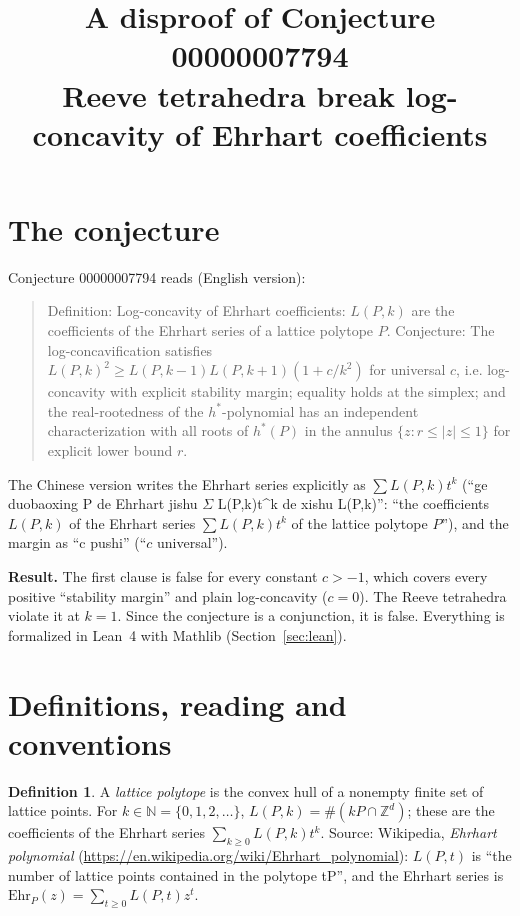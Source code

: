 \documentclass[11pt]{article}
\title{A disproof of Conjecture 00000007794\\[2pt]
\large Reeve tetrahedra break log-concavity of Ehrhart coefficients}
\date{}
\renewcommand{\_}{\oldus\allowbreak}
\theoremstyle{definition}
\newtheorem{definition}[theorem]{Definition}
\newcommand{\Z}{\mathbb{Z}}
\newcommand{\N}{\mathbb{N}}
\begin{document}
\sloppy
\maketitle

\section{The conjecture}

Conjecture 00000007794 reads (English version):

\begin{quote}
Definition: Log-concavity of Ehrhart coefficients: $L(P,k)$ are the coefficients of the Ehrhart series of
a lattice polytope $P$. Conjecture: The log-concavification satisfies $L(P,k)^2 \ge L(P,k-1)
L(P,k+1)(1 + c/k^2)$ for universal $c$, i.e. log-concavity with explicit stability margin; equality
holds at the simplex; and the real-rootedness of the $h^*$-polynomial has an independent
characterization with all roots of $h^*(P)$ in the annulus $\{z: r \le |z| \le 1\}$ for explicit lower
bound $r$.
\end{quote}

The Chinese version writes the Ehrhart series explicitly as $\sum L(P,k)t^k$ (``ge duobaoxing P de
Ehrhart jishu $\Sigma$ L(P,k)t\^{}k de xishu L(P,k)'': ``the coefficients $L(P,k)$ of the Ehrhart series
$\sum L(P,k)t^k$ of the lattice polytope $P$''), and the margin as ``c pushi'' (``$c$ universal'').

\textbf{Result.} The first clause is false for every constant $c > -1$, which covers every positive
``stability margin'' and plain log-concavity ($c = 0$). The Reeve tetrahedra violate it at $k = 1$.
Since the conjecture is a conjunction, it is false. Everything is formalized in Lean~4 with Mathlib
(Section~\ref{sec:lean}).

\section{Definitions, reading and conventions}

\begin{definition}
A \emph{lattice polytope} is the convex hull of a nonempty finite set of lattice points. For $k \in \N =
\{0,1,2,\dots\}$, $L(P,k) = \#(kP \cap \Z^d)$; these are the coefficients of the Ehrhart series $\sum_{k
\ge 0} L(P,k) t^k$. Source: Wikipedia, \emph{Ehrhart polynomial}
(\url{https://en.wikipedia.org/wiki/Ehrhart_polynomial}): $L(P,t)$ is ``the number of lattice points
contained in the polytope tP'', and the Ehrhart series is $\mathrm{Ehr}_P(z) = \sum_{t \ge 0} L(P,t)
z^t$.
\end{definition}
\end{document}
